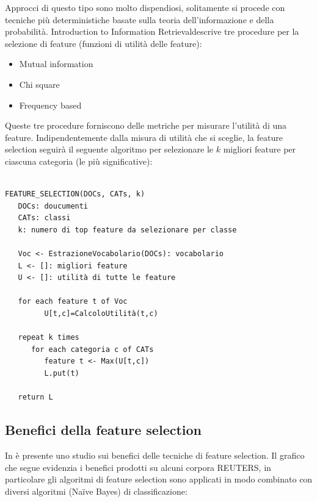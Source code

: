 \documentclass{article}
\theoremstyle{plain}
\theoremstyle{definition}
\begin{document}
Approcci di questo tipo sono molto dispendiosi, solitamente si procede con tecniche più deterministiche basate sulla teoria dell'informazione e della probabilità. Introduction to Information Retrieval\footnotemark descrive tre procedure per la selezione di feature (funzioni di utilità delle feature):
\begin{itemize}  
\item Mutual information
\item Chi square
\item Frequency based
\end{itemize}
Queste tre procedure forniscono delle metriche per misurare l'utilità di una feature. Indipendentemente dalla misura di utilità che si sceglie, la feature selection seguirà il seguente algoritmo per selezionare le $k$ migliori feature per ciascuna categoria (le più significative):
\\
\\
\begin{verbatim}
FEATURE_SELECTION(DOCs, CATs, k)
   DOCs: doucumenti
   CATs: classi
   k: numero di top feature da selezionare per classe 
   
   Voc <- EstrazioneVocabolario(DOCs): vocabolario
   L <- []: migliori feature
   U <- []: utilità di tutte le feature   
   
   for each feature t of Voc
         U[t,c]=CalcoloUtilità(t,c)
   
   repeat k times      
      for each categoria c of CATs
         feature t <- Max(U[t,c])       
         L.put(t)
   
   return L
\end{verbatim} 

\newpage
\subsection{Benefici della feature selection}
In  è presente uno studio sui benefici delle tecniche di feature selection. Il grafico che segue evidenzia i benefici prodotti su alcuni corpora REUTERS, in particolare gli algoritmi di feature selection sono applicati in modo combinato con diversi algoritmi (Naïve Bayes) di classificazione:
\end{document}
